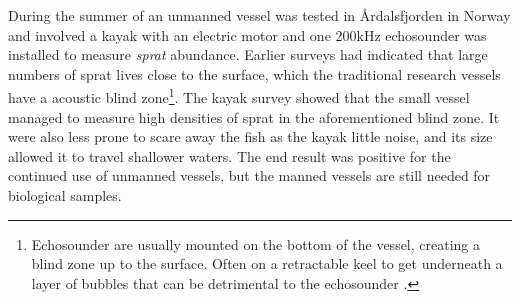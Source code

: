         During the summer of \citeyear{johnsen2020measuring} an unmanned vessel was tested in Årdalsfjorden in Norway and involved a kayak with an electric motor and one 200kHz echosounder was installed to measure \textit{sprat} abundance. Earlier surveys had indicated that large numbers of sprat lives close to the surface, which the traditional research vessels have a acoustic blind zone\footnote{Echosounder are usually mounted on the bottom of the vessel, creating a blind zone up to the surface. Often on a retractable keel to get underneath a layer of bubbles that can be detrimental to the echosounder \cite{korneliussen2008proposals}.}. The kayak survey showed that the small vessel managed to measure high densities of sprat in the aforementioned blind zone. It were also less prone to scare away the fish as the kayak little noise, and its size allowed it to travel shallower waters. The end result was positive for the continued use of unmanned vessels, but the manned vessels are still needed for biological samples\cite{johnsen2020measuring}. %
        



    

    
